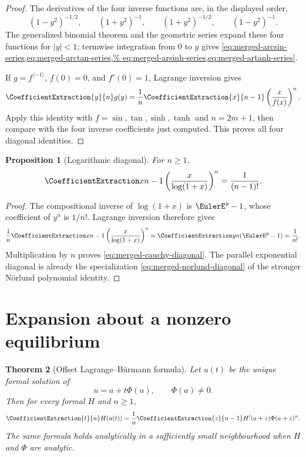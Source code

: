 \documentclass[11pt,a4paper,oneside,openany]{book}
\newtheorem{theorem}{Theorem}[chapter]
\newtheorem{proposition}[theorem]{Proposition}
\theoremstyle{definition}
\theoremstyle{remark}
\begin{document}
\begin{proof}
The derivatives of the four inverse functions are, in the displayed order,
\[
 (1-y^2)^{-1/2},\qquad (1+y^2)^{-1},\qquad
 (1+y^2)^{-1/2},\qquad (1-y^2)^{-1}.
\]
The generalized binomial theorem and the geometric series expand these four
functions for $|y|<1$; termwise integration from $0$ to $y$ gives
\cref{eq:merged-arcsin-series,eq:merged-arctan-series,%
eq:merged-arsinh-series,eq:merged-artanh-series}.

If $g=f^{\langle-1\rangle}$, $f(0)=0$, and $f'(0)=1$, Lagrange inversion gives
\[
 \CoefficientExtraction{y}{n}g(y)=\frac1n\CoefficientExtraction{x}{n-1}\left(\frac{x}{f(x)}\right)^n.
\]
Apply this identity with $f=\sin,\tan,\sinh,\tanh$ and $n=2m+1$, then compare
with the four inverse coefficients just computed.  This proves all four
diagonal identities.
\end{proof}

\begin{proposition}[Logarithmic diagonal]
\label{prop:merged-cauchy-diagonal}
For $n\geq1$,
\begin{equation}
 \CoefficientExtraction x{n-1}
 \left(\frac{x}{\log(1+x)}\right)^n
 =\frac1{(n-1)!}.                                                  \label{eq:merged-cauchy-diagonal}
\end{equation}
\end{proposition}

\begin{proof}
The compositional inverse of $\log(1+x)$ is $\EulerE^y-1$, whose coefficient
of $y^n$ is $1/n!$.  Lagrange inversion therefore gives
\[
 \frac1n\CoefficientExtraction x{n-1}
 \left(\frac{x}{\log(1+x)}\right)^n
 =\CoefficientExtraction y n(\EulerE^y-1)=\frac1{n!}.
\]
Multiplication by $n$ proves \eqref{eq:merged-cauchy-diagonal}.  The parallel
exponential diagonal is already the specialization
\eqref{eq:merged-norlund-diagonal} of the stronger N\"orlund polynomial
identity.
\end{proof}

\section{Expansion about a nonzero equilibrium}

\begin{theorem}[Offset Lagrange--B\"urmann formula]
\label{thm:merged-offset-lagrange}
Let $u(t)$ be the unique formal solution of
\begin{equation}
 u=a+t\Phi(u),\qquad \Phi(a)\ne0.                                  \label{eq:merged-offset-equation}
\end{equation}
Then for every formal $H$ and $n\geq1$,
\begin{equation}
 \CoefficientExtraction{t}{n}H(u(t))
 =\frac1n\CoefficientExtraction{z}{n-1}H'(a+z)\Phi(a+z)^n.                              \label{eq:merged-offset-lagrange}
\end{equation}
The same formula holds analytically in a sufficiently small neighbourhood
when $H$ and $\Phi$ are analytic.
\end{theorem}
\end{document}

